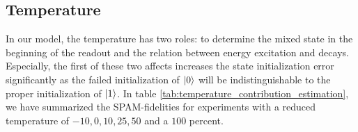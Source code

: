 

\subsection{Temperature}
In our model, the temperature has two roles: to determine the mixed state in the beginning of the readout and the relation between energy excitation and decays. Especially, the first of these two affects increases the state initialization error significantly as the failed initialization of $\ket{0}$ will be indistinguishable to the proper initialization of $\ket{1}$. In table \ref{tab:temperature_contribution_estimation}, we have summarized the SPAM-fidelities for experiments with a reduced temperature of $-10, 0, 10, 25, 50$ and a $100$ percent. 

